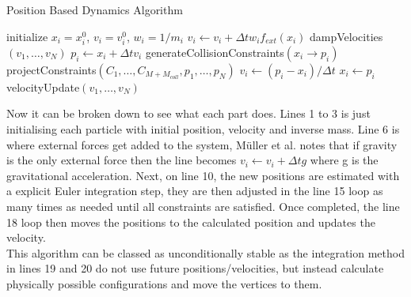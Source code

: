 \documentclass[12pt,a4paper]{article}
\begin{document}
\begin{algorithm}
\caption{Position Based Dynamics Algorithm}
\begin{algorithmic}[1]
	\State initialize $x_i = x_i^0$, $v_i = v_i^0$, $w_i = 1/m_i$
\EndFor
\Loop
	\State $v_i \leftarrow v_i + \Delta t w_i f_{ext}(x_i)$
	\EndFor
	\State dampVelocities$(v_1, \dots, v_N)$
		\State $p_i \leftarrow x_i + \Delta t v_i$
	\EndFor
		\State generateCollisionConstraints$(x_i \rightarrow p_i)$
	\EndFor
	\State projectConstraints$(C_1, \ldots, C_{M+M_{coll}}, p_1, \ldots, p_N)$
	\EndLoop
		\State $v_i \leftarrow (p_i - x_i) / \Delta t$
		\State $x_i \leftarrow p_i$
	\EndFor
	\State velocityUpdate$(v_1, \dots, v_N)$
\EndLoop
\end{algorithmic}
\end{algorithm}
\newpage
Now it can be broken down to see what each part does. Lines 1 to 3 is just initialising each particle with initial position, velocity and inverse mass. Line 6 is where external forces get added to the system, Müller et al. notes that if gravity is the only external force then the line becomes $v_i \leftarrow v_i + \Delta tg$ where g is the gravitational acceleration. Next, on line 10, the new positions are estimated with a explicit Euler integration step, they are then adjusted in the line 15 loop as many times as needed until all constraints are satisfied. Once completed, the line 18 loop then moves the positions to the calculated position and updates the velocity. 
\\
This algorithm can be classed as unconditionally stable as the integration method in lines 19 and 20 do not use future positions/velocities, but instead calculate physically possible configurations and move the vertices to them.\\
\end{document}
